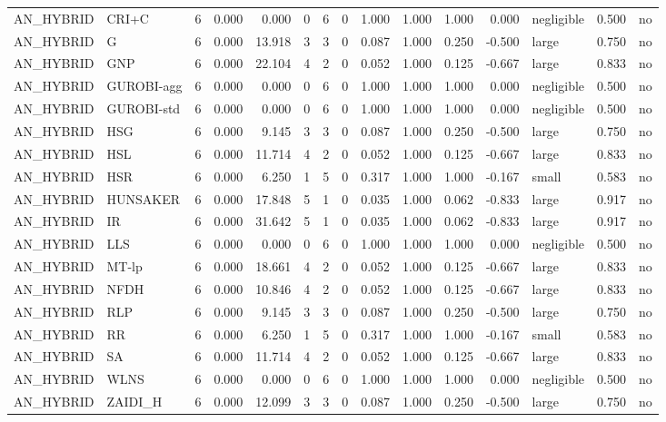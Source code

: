 \begin{table}[htbp]
\begin{tabular}{llrrrrrrrrrrlrr}
AN\_HYBRID & CRI+C & 6 & 0.000 & 0.000 & 0 & 6 & 0 & 1.000 & 1.000 & 1.000 & 0.000 & negligible & 0.500 & no \\
AN\_HYBRID & G & 6 & 0.000 & 13.918 & 3 & 3 & 0 & 0.087 & 1.000 & 0.250 & -0.500 & large & 0.750 & no \\
AN\_HYBRID & GNP & 6 & 0.000 & 22.104 & 4 & 2 & 0 & 0.052 & 1.000 & 0.125 & -0.667 & large & 0.833 & no \\
AN\_HYBRID & GUROBI-agg & 6 & 0.000 & 0.000 & 0 & 6 & 0 & 1.000 & 1.000 & 1.000 & 0.000 & negligible & 0.500 & no \\
AN\_HYBRID & GUROBI-std & 6 & 0.000 & 0.000 & 0 & 6 & 0 & 1.000 & 1.000 & 1.000 & 0.000 & negligible & 0.500 & no \\
AN\_HYBRID & HSG & 6 & 0.000 & 9.145 & 3 & 3 & 0 & 0.087 & 1.000 & 0.250 & -0.500 & large & 0.750 & no \\
AN\_HYBRID & HSL & 6 & 0.000 & 11.714 & 4 & 2 & 0 & 0.052 & 1.000 & 0.125 & -0.667 & large & 0.833 & no \\
AN\_HYBRID & HSR & 6 & 0.000 & 6.250 & 1 & 5 & 0 & 0.317 & 1.000 & 1.000 & -0.167 & small & 0.583 & no \\
AN\_HYBRID & HUNSAKER & 6 & 0.000 & 17.848 & 5 & 1 & 0 & 0.035 & 1.000 & 0.062 & -0.833 & large & 0.917 & no \\
AN\_HYBRID & IR & 6 & 0.000 & 31.642 & 5 & 1 & 0 & 0.035 & 1.000 & 0.062 & -0.833 & large & 0.917 & no \\
AN\_HYBRID & LLS & 6 & 0.000 & 0.000 & 0 & 6 & 0 & 1.000 & 1.000 & 1.000 & 0.000 & negligible & 0.500 & no \\
AN\_HYBRID & MT-lp & 6 & 0.000 & 18.661 & 4 & 2 & 0 & 0.052 & 1.000 & 0.125 & -0.667 & large & 0.833 & no \\
AN\_HYBRID & NFDH & 6 & 0.000 & 10.846 & 4 & 2 & 0 & 0.052 & 1.000 & 0.125 & -0.667 & large & 0.833 & no \\
AN\_HYBRID & RLP & 6 & 0.000 & 9.145 & 3 & 3 & 0 & 0.087 & 1.000 & 0.250 & -0.500 & large & 0.750 & no \\
AN\_HYBRID & RR & 6 & 0.000 & 6.250 & 1 & 5 & 0 & 0.317 & 1.000 & 1.000 & -0.167 & small & 0.583 & no \\
AN\_HYBRID & SA & 6 & 0.000 & 11.714 & 4 & 2 & 0 & 0.052 & 1.000 & 0.125 & -0.667 & large & 0.833 & no \\
AN\_HYBRID & WLNS & 6 & 0.000 & 0.000 & 0 & 6 & 0 & 1.000 & 1.000 & 1.000 & 0.000 & negligible & 0.500 & no \\
AN\_HYBRID & ZAIDI\_H & 6 & 0.000 & 12.099 & 3 & 3 & 0 & 0.087 & 1.000 & 0.250 & -0.500 & large & 0.750 & no \\

\end{tabular}
\end{table}
